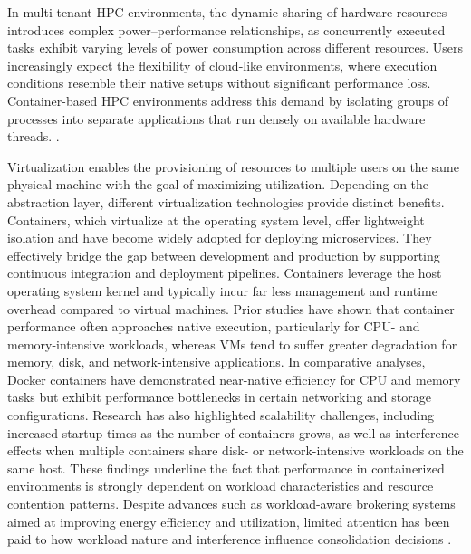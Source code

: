 In multi-tenant HPC environments, the dynamic sharing of hardware resources introduces complex power–performance relationships, as concurrently executed tasks exhibit varying levels of power consumption across different resources. Users increasingly expect the flexibility of cloud-like environments, where execution conditions resemble their native setups without significant performance loss. Container-based HPC environments address this demand by isolating groups of processes into separate applications that run densely on available hardware threads. \cite{Kuity_2023}.

Virtualization enables the provisioning of resources to multiple users on the same physical machine with the goal of maximizing utilization. Depending on the abstraction layer, different virtualization technologies provide distinct benefits. Containers, which virtualize at the operating system level, offer lightweight isolation and have become widely adopted for deploying microservices. They effectively bridge the gap between development and production by supporting continuous integration and deployment pipelines.
Containers leverage the host operating system kernel and typically incur far less management and runtime overhead compared to virtual machines. Prior studies have shown that container performance often approaches native execution, particularly for CPU- and memory-intensive workloads, whereas VMs tend to suffer greater degradation for memory, disk, and network-intensive applications. In comparative analyses, Docker containers have demonstrated near-native efficiency for CPU and memory tasks but exhibit performance bottlenecks in certain networking and storage configurations. Research has also highlighted scalability challenges, including increased startup times as the number of containers grows, as well as interference effects when multiple containers share disk- or network-intensive workloads on the same host. These findings underline the fact that performance in containerized environments is strongly dependent on workload characteristics and resource contention patterns. Despite advances such as workload-aware brokering systems aimed at improving energy efficiency and utilization, limited attention has been paid to how workload nature and interference influence consolidation decisions \cite{8397647}.

